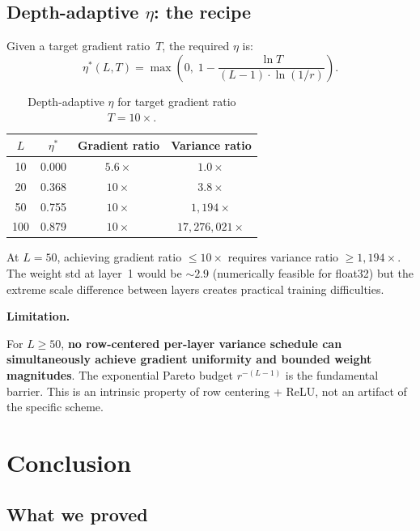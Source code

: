 \documentclass[11pt,a4paper]{article}
\theoremstyle{definition}
\newenvironment{warnbox}{%
  \begin{mdframed}[linecolor=red!75!black,backgroundcolor=red!5!white,linewidth=1.5pt]%
  \textbf{\textcolor{red!75!black}{Limitation.}}\ %
}{%
  \end{mdframed}%
}
\begin{document}
\subsection{Depth-adaptive $\eta$: the recipe}

Given a target gradient ratio~$T$, the required $\eta$ is:
\begin{equation}\label{eq:eta-adaptive}
  \eta^{\ast}(L, T) = \max\!\left(0,\; 1 - \frac{\ln T}{(L-1) \cdot \ln(1/r)}\right).
\end{equation}

\begin{table}[H]
\centering
\caption{Depth-adaptive $\eta$ for target gradient ratio $T = 10\times$.}
\label{tab:adaptive}
\begin{tabular}{c c c c}
\toprule
$L$ & $\eta^{\ast}$ & Gradient ratio & Variance ratio \\
\midrule
10  & 0.000 & $5.6\times$  & $1.0\times$ \\
20  & 0.368 & $10\times$   & $3.8\times$ \\
50  & 0.755 & $10\times$   & $1{,}194\times$ \\
100 & 0.879 & $10\times$   & $17{,}276{,}021\times$ \\
\bottomrule
\end{tabular}
\end{table}

At $L = 50$, achieving gradient ratio $\leq 10\times$ requires variance
ratio $\geq 1{,}194\times$.  The weight std at layer~1 would be
$\sim\!2.9$ (numerically feasible for float32) but the extreme scale
difference between layers creates practical training difficulties.

\begin{warnbox}
For $L \geq 50$, \textbf{no row-centered per-layer variance schedule can
simultaneously achieve gradient uniformity and bounded weight magnitudes}.
The exponential Pareto budget $r^{-(L-1)}$ is the fundamental barrier.
This is an intrinsic property of row centering + ReLU, not an artifact
of the specific scheme.
\end{warnbox}


\section{Conclusion}
\label{sec:conclusion}

\subsection{What we proved}
\end{document}
